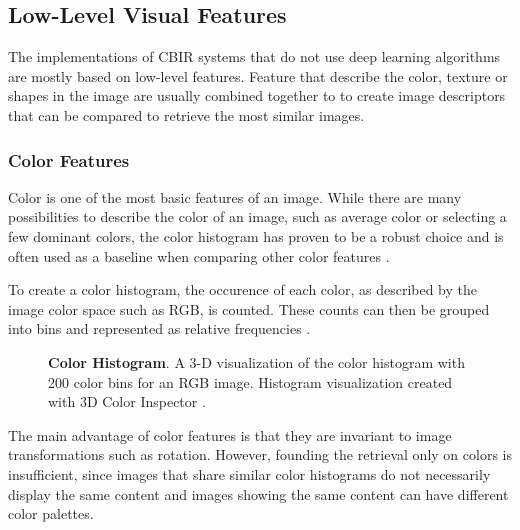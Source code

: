 \documentclass[12pt]{report}
\begin{document}
\pagebreak
\subsection{Low-Level Visual Features}
The implementations of CBIR systems that do not use deep learning algorithms are mostly based on low-level features. Feature that describe the color, texture or shapes in the image are usually combined together to to create image descriptors that can be compared to retrieve the most similar images.

\subsubsection{Color Features}
Color is one of the most basic features of an image. While there are many possibilities to describe the color of an image, such as average color or selecting a few dominant colors, the color histogram has proven to be a robust choice and is often used as a baseline when comparing other color features \cite{Torres_content-basedimage}.

To create a color histogram, the occurence of each color, as described by the image color space such as RGB, is counted. These counts can then be grouped into bins and represented as relative frequencies \cite{Swain1991}.

\begin{figure}[h]
\centering
{}
\caption{\label{fig:color_hist} \textbf{Color Histogram}. A 3-D visualization of the color histogram with 200 color bins for an RGB image. Histogram visualization created with 3D Color Inspector \cite{barthel_3d_nodate}.}
\end{figure}

The main advantage of color features is that they are invariant to image transformations such as rotation. However, founding the retrieval only on colors is insufficient, since images that share similar color histograms do not necessarily display the same content and images showing the same content can have different color palettes.
\end{document}
